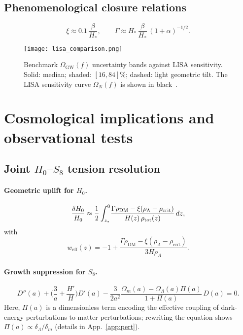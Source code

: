 \documentclass[preprint,aps,prd,onecolumn,nofootinbib,longbibliography]{revtex4-2}
\numberwithin{equation}{section}
\begin{document}
\subsection{Phenomenological closure relations}
\label{sec:closure}
\begin{equation}
\xi \approx 0.1\,\frac{\beta}{H_*},\qquad
\Gamma \approx H_*\,\frac{\beta}{H_*}\,(1+\alpha)^{-1/2}.
\end{equation}

\begin{figure}[H]
  \centering
  \texttt{[image: lisa\_comparison.png]}
  \caption{
    Benchmark $\Omega_{\mathrm{GW}}(f)$ uncertainty bands against LISA sensitivity. 
    Solid: median; shaded: $[16,84]\%$; dashed: light geometric tilt.
    The LISA sensitivity curve $\Omega_N(f)$ is shown in black~\cite{Amaro2017}.
  }
  \label{fig:lisa}
\end{figure}

\section{Cosmological implications and observational tests}
\label{sec:cosmo}

\subsection{Joint $H_0$--$S_8$ tension resolution}
\label{sec:H0S8}
\paragraph*{Geometric uplift for $H_0$.}
\begin{equation}
\frac{\delta H_0}{H_0}\approx \frac{1}{2}\int_{z_*}^{0}\!\frac{\Gamma\rho_{\mathrm{DM}}-\xi(\rho_\Lambda-\rho_{\mathrm{crit}})}{H(z)\,\rho_{\rm tot}(z)}\,dz,
\end{equation}
with
\begin{equation}
w_{\mathrm{eff}}(z)=-1+\frac{\Gamma\rho_{\mathrm{DM}}-\xi(\rho_\Lambda-\rho_{\mathrm{crit}})}{3H\rho_\Lambda}.
\end{equation}
\paragraph*{Growth suppression for $S_8$.}
\begin{equation}
D''(a)+\Big(\frac{3}{a}+\frac{H'}{H}\Big)D'(a)-\frac{3}{2a^2}\frac{\Omega_m(a)-\Omega_\Lambda(a)\Pi(a)}{1+\Pi(a)}\,D(a)=0.
\end{equation}
Here, $\Pi(a)$ is a dimensionless term encoding the effective coupling of dark-energy perturbations to matter perturbations; rewriting the equation shows $\Pi(a)\propto \delta_\Lambda / \delta_m$ (details in App.~\ref{app:pert}).
\end{document}

